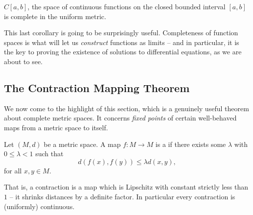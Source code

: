 \begin{corollary}
    $C[a, b]$, the space of continuous functions on the closed bounded interval $[a, b]$ is complete in the uniform metric.
\end{corollary}

This last corollary is going to be surprisingly useful. Completeness of function spaces is what will let us \emph{construct} functions as limits -- and in particular, it is the key to proving the existence of solutions to differential equations, as we are about to see.

\subsection{The Contraction Mapping Theorem}

We now come to the highlight of this section, which is a genuinely useful theorem about complete metric spaces. It concerns \emph{fixed points} of certain well-behaved maps from a metric space to itself.

\begin{definition}[Contraction]
    Let $(M, d)$ be a metric space. A map $f : M \rightarrow M$ is a  if there exists some $\lambda$ with $0 \leq \lambda < 1$ such that
    $$
    d(f(x), f(y)) \leq \lambda d(x, y),
    $$
    for all $x, y \in M$.
\end{definition}

That is, a contraction is a map which is Lipschitz with constant strictly less than $1$ -- it shrinks distances by a definite factor. In particular every contraction is (uniformly) continuous.


